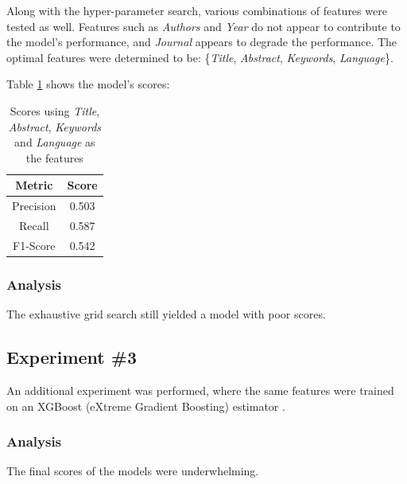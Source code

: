 \documentclass[11pt]{article}
\begin{document}
Along with the hyper-parameter search, various combinations of features were tested as well. Features such as \textit{Authors} and \textit{Year} do not appear to contribute to the model's performance, and \textit{Journal} appears to degrade the performance. The optimal features were determined to be: \{\textit{Title}, \textit{Abstract}, \textit{Keywords}, \textit{Language}\}.

Table \ref{table:gs1_score} shows the model's scores:
\begin{table}[!ht]
    \caption{Scores using \textit{Title}, \textit{Abstract}, \textit{Keywords} and \textit{Language} as the features}
    \label{table:gs1_score}
    \begin{center}

        \begin{tabular}{| c | c |}
        \hline
        \textbf{Metric} & \textbf{Score}
        \\ \hline
        Precision & 0.503 
        \\ \hline
        Recall & 0.587
        \\ \hline
        F1-Score & 0.542
        \\ \hline
        \end{tabular}

    \end{center}

\end{table}

\subsubsection*{Analysis}
The exhaustive grid search still yielded a model with poor scores.

\subsection*{Experiment \#3}
An additional experiment was performed, where the same features were trained on an XGBoost (eXtreme Gradient Boosting) estimator \cite{Chen_2016}. 



\subsubsection*{Analysis}
The final scores of the models were underwhelming.
\end{document}

